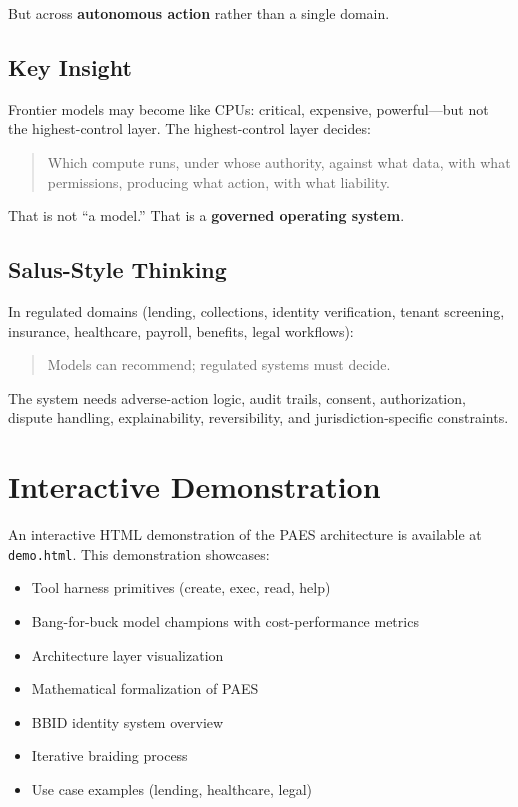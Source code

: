 \documentclass[11pt,a4paper]{article}
\begin{document}
But across \textbf{autonomous action} rather than a single domain.

\subsection{Key Insight}

Frontier models may become like CPUs: critical, expensive, powerful—but not the highest-control layer. The highest-control layer decides:
\begin{quote}
Which compute runs, under whose authority, against what data, with what permissions, producing what action, with what liability.
\end{quote}

That is not ``a model.'' That is a \textbf{governed operating system}.

\subsection{Salus-Style Thinking}

In regulated domains (lending, collections, identity verification, tenant screening, insurance, healthcare, payroll, benefits, legal workflows):
\begin{quote}
Models can recommend; regulated systems must decide.
\end{quote}

The system needs adverse-action logic, audit trails, consent, authorization, dispute handling, explainability, reversibility, and jurisdiction-specific constraints.

\section{Interactive Demonstration}

An interactive HTML demonstration of the PAES architecture is available at \texttt{demo.html}. This demonstration showcases:

\begin{itemize}
    \item Tool harness primitives (create, exec, read, help)
    \item Bang-for-buck model champions with cost-performance metrics
    \item Architecture layer visualization
    \item Mathematical formalization of PAES
    \item BBID identity system overview
    \item Iterative braiding process
    \item Use case examples (lending, healthcare, legal)
\end{itemize}
\end{document}
